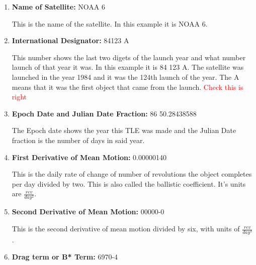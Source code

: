 \documentclass[12pt]{report}
\begin{document}
	\begin{enumerate}
		\item \textbf{Name of Satellite:} NOAA 6
		
		This is the name of the satellite. In this example it is NOAA 6.
		\item 	\textbf{International Designator:} 84123 A
		
		This number shows the last two digets of the launch year and what number launch of that year it was. In this example it is 84 123 A. The satellite was launched in the year 1984 and it was the 124th launch of the year. The A means that it was the first object that came from the launch. \textcolor{red}{Check this is right}
		
		\item \textbf{Epoch Date and Julian Date Fraction:} 86 50.28438588
		
		The Epoch date shows the year this TLE was made and the Julian Date fraction is the number of days in said year. 
		
		\item \textbf{First Derivative of Mean Motion:} 0.00000140
		
		This is the daily rate of change of number of revolutions the object completes per day divided by two. This is also called the ballistic coefficient.\cite{NASATLE} It's units are $\frac{rev}{day^2}$. 
		
		\item \textbf{Second Derivative of Mean Motion:} 00000-0
		
		This is the second derivative of mean motion divided by six, with units of $\frac{rev}{day^3}$.
		
		\item \textbf{Drag term or B* Term: }6970-4
		

\end{enumerate}
\end{document}
